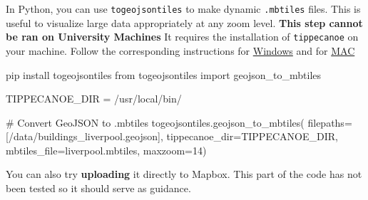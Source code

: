 \documentclass[
  letterpaper,
  DIV=11,
  numbers=noendperiod]{scrreprt}
\newenvironment{Shaded}{\begin{snugshade}}{\end{snugshade}}
\newcommand{\CommentTok}[1]{\textcolor[rgb]{0.37,0.37,0.37}{#1}}
\newcommand{\DecValTok}[1]{\textcolor[rgb]{0.68,0.00,0.00}{#1}}
\newcommand{\ImportTok}[1]{\textcolor[rgb]{0.00,0.46,0.62}{#1}}
\newcommand{\NormalTok}[1]{\textcolor[rgb]{0.00,0.23,0.31}{#1}}
\newcommand{\OperatorTok}[1]{\textcolor[rgb]{0.37,0.37,0.37}{#1}}
\newcommand{\StringTok}[1]{\textcolor[rgb]{0.13,0.47,0.30}{#1}}
\begin{document}
In Python, you can use \texttt{togeojsontiles} to make dynamic
\texttt{.mbtiles} files. This is useful to visualize large data
appropriately at any zoom level. \textbf{This step cannot be ran on
University Machines} It requires the installation of \texttt{tippecanoe}
on your machine. Follow the corresponding instructions for
\href{https://gist.github.com/ryanbaumann/e5c7d76f6eeb8598e66c5785b677726e}{Windows}
and for \href{https://github.com/mapbox/tippecanoe}{MAC}

\begin{Shaded}
\begin{Highlighting}[]
\NormalTok{pip install togeojsontiles}
\ImportTok{from}\NormalTok{ togeojsontiles }\ImportTok{import}\NormalTok{ geojson\_to\_mbtiles}

\NormalTok{TIPPECANOE\_DIR }\OperatorTok{=} \StringTok{\textquotesingle{}/usr/local/bin/\textquotesingle{}}

\CommentTok{\# Convert GeoJSON to .mbtiles}
\NormalTok{togeojsontiles.geojson\_to\_mbtiles(}
\NormalTok{    filepaths}\OperatorTok{=}\NormalTok{[}\StringTok{\textquotesingle{}/data/buildings\_liverpool.geojson\textquotesingle{}}\NormalTok{],}
\NormalTok{    tippecanoe\_dir}\OperatorTok{=}\NormalTok{TIPPECANOE\_DIR,}
\NormalTok{    mbtiles\_file}\OperatorTok{=}\StringTok{\textquotesingle{}liverpool.mbtiles\textquotesingle{}}\NormalTok{,}
\NormalTok{    maxzoom}\OperatorTok{=}\DecValTok{14}\NormalTok{)}
\end{Highlighting}
\end{Shaded}

You can also try \textbf{uploading} it directly to Mapbox. This part of
the code has not been tested so it should serve as guidance.
\end{document}
